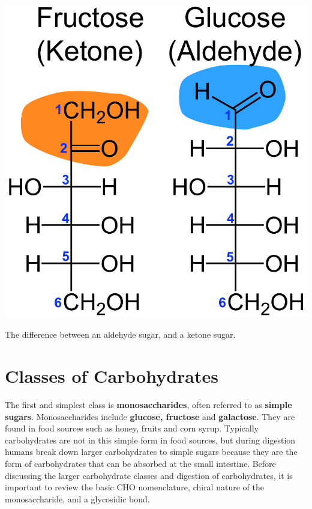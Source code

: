 \documentclass{tufte-handout}
\begin{document}
\begin{marginfigure}
\includegraphics{figures/sugar-aldehydes.pdf}
\caption{The difference between an aldehyde sugar, and a ketone sugar.}
\label{fig:sugar-aldehydes}
\end{marginfigure}

\section{Classes of Carbohydrates}\label{classes-of-carbohydrates}


 The first and simplest class is \textbf{monosaccharides}, often referred to as \textbf{simple sugars}. Monosaccharides include \textbf{glucose, fructose} and \textbf{galactose}. They are found in food sources such as honey, fruits and corn syrup. Typically carbohydrates are not in this simple form in food sources, but during digestion humans break down larger carbohydrates to simple sugars because they are the form of carbohydrates that can be absorbed at the small intestine. Before discussing the larger carbohydrate classes and digestion of carbohydrates, it is important to review the basic CHO nomenclature, chiral nature of the monosaccharide, and a glycosidic bond.
\end{document}
